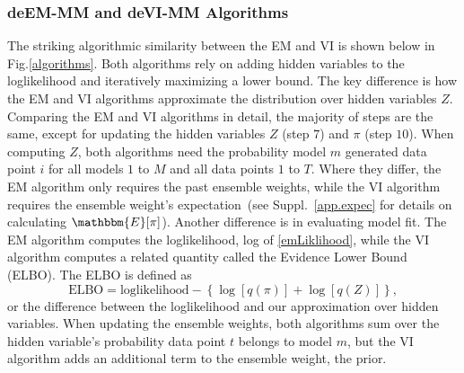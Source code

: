 \documentclass[12pt]{article}
\def\l{\left}
\def\r{\right}
\begin{document}
\subsubsection{deEM-MM and deVI-MM Algorithms}
The striking algorithmic similarity between the EM and VI is shown below in Fig.\ref{algorithms}.
Both algorithms rely on adding hidden variables to the loglikelihood and iteratively maximizing a lower bound.
The key difference is how the EM and VI algorithms approximate the distribution over hidden variables $Z$.
Comparing the EM and VI algorithms in detail, the majority of steps are the same, except for updating the hidden variables $Z$ (step $7$) and $\pi$ (step $10$). 
When computing $Z$, both algorithms need the probability model $m$ generated data point $i$ for all models $1$ to $M$ and all data points $1$ to $T$. 
Where they differ, the EM algorithm only requires the past ensemble weights, while the VI algorithm requires the ensemble weight's expectation~(see Suppl.~\ref{app.expec} for details on calculating $\mathbbm{E}[\pi]$).
Another difference is in evaluating model fit.
The EM algorithm computes the loglikelihood, log of \eqref{emLiklihood}, while the VI algorithm computes a related quantity called the Evidence Lower Bound (ELBO).
The ELBO is defined as 
\begin{equation}
    \text{ELBO} = \text{loglikelihood} - \l\{\log[q(\pi)] + \log[q(Z)]\r\},
\end{equation}
or the difference between the loglikelihood and our approximation over hidden variables.
When updating the ensemble weights, both algorithms sum over the hidden variable's probability data point $t$ belongs to model $m$, but the VI algorithm adds an additional term to the ensemble weight, the prior.
\end{document}
